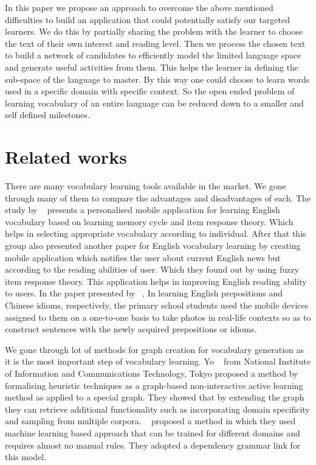 \documentclass[11pt,a4paper]{article}
\begin{document}
In this paper we propose an approach to overcome the above mentioned
difficulties to build an application that could potentially satisfy our targeted
learners. We do this by partially sharing the problem with the learner to choose the 
text of their own interest and reading level. Then we process the chosen text to
build a network of candidates to efficiently model the limited language space and
generate useful activities from them. This helps
the learner in defining the sub-space of the language to master. By this way one
could choose to learn words used in a specific domain with specific context.
So the open ended problem of learning vocabulary of an entire language can be reduced
down to a smaller and self defined milestones.

\section{Related works}
There are many vocabulary learning tools available in the market.
We gone through many of them to compare the advantages and disadvantages of each.
The study by ~\cite{chen2008personalized} presents a personalised mobile application for
learning English vocabulary based on learning memory cycle and item response theory.
Which helps in selecting appropriate vocabulary according to individual.
After that this group also presented another paper for English vocabulary
learning by creating mobile application which notifies the user about current
English news but according to the reading abilities of user. Which they found out
by using fuzzy item response theory. This application helps in improving English reading ability to users.
In the paper presented by ~\citet{wong2010mobile}, In learning English prepositions and Chinese idioms, respectively,
the primary school students used the mobile devices assigned to them on a one-to-one basis
to take photos in real-life contexts so as to construct sentences with the newly acquired prepositions or idioms.

We gone through lot of methods for graph creation for vocabulary generation as
it is the most important step of vocabulary learning. Yo ~\citet{ehara2014formalizing}
from National Institute of Information and Communications Technology, Tokyo proposed
a method by formalising heuristic techniques as a graph-based non-interactive active
learning method as applied to a special graph. They showed that by extending the graph
they can retrieve additional functionality such as incorporating domain specificity and sampling from multiple corpora.
~\citet{zhang2001learning} proposed a method in which they used machine learning based approach
that can be trained for different domains and requires almost no manual rules.
They adopted a dependency grammar link for this model.
\end{document}
